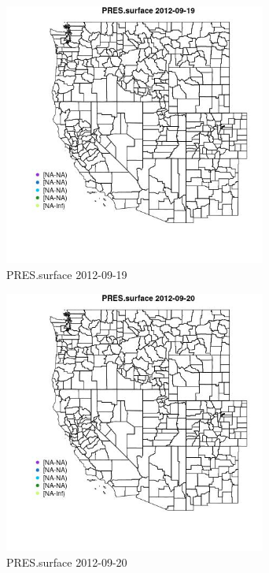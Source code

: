 \begin{figure} 
\centering  
\includegraphics[width=0.77\textwidth]{Code_Outputs/ML_input_report_ML_input_PM25_Step5_part_d_de_duplicated_aves_ML_input_MapObsPRESsurface2012-09-19.jpg} 
\caption{\label{fig:ML_input_report_ML_input_PM25_Step5_part_d_de_duplicated_aves_ML_inputMapObsPRESsurface2012-09-19}PRES.surface 2012-09-19} 
\end{figure} 
 

\begin{figure} 
\centering  
\includegraphics[width=0.77\textwidth]{Code_Outputs/ML_input_report_ML_input_PM25_Step5_part_d_de_duplicated_aves_ML_input_MapObsPRESsurface2012-09-20.jpg} 
\caption{\label{fig:ML_input_report_ML_input_PM25_Step5_part_d_de_duplicated_aves_ML_inputMapObsPRESsurface2012-09-20}PRES.surface 2012-09-20} 
\end{figure} 
 

